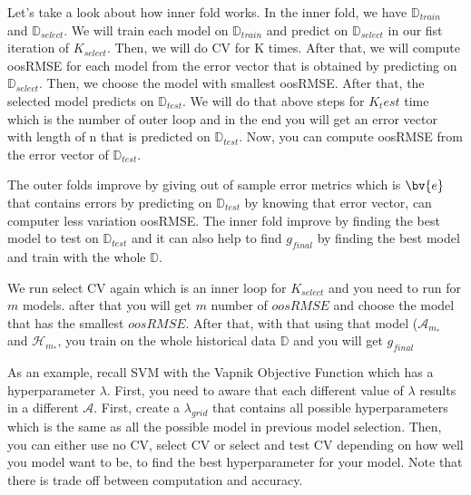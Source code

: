 \documentclass[12pt]{article}
\begin{document}
\begin{enumerate}
Let's take a look about how inner fold works. In the inner fold, we have $\mathbb{D}_{train}$ and $\mathbb{D}_{select}$. We will train each model on $\mathbb{D}_{train}$ and predict on $\mathbb{D}_{select}$ in our fist iteration of $K_{select}$. Then, we will do CV for K times. After that, we will compute oosRMSE for each model from the error vector that is obtained by predicting on $\mathbb{D}_{select}$. Then, we choose the model with smallest oosRMSE. After that, the selected model predicts on $\mathbb{D}_{test}$. 
We will do that above steps for $K_test$ time which is the number of outer loop and in the end you will get an error vector with length of n that is predicted on $\mathbb{D}_{test}$. Now, you can compute oosRMSE from the error vector of $\mathbb{D}_{test}$.

The outer folds improve by giving out of sample error metrics which is $\bv{e}$ that contains errors by predicting on $\mathbb{D}_{test}$ by knowing that error vector, can computer less variation oosRMSE.  The inner fold improve by finding the best model to test on $\mathbb{D}_{test}$ and it can also help to find $g_{final}$ by finding the best model and train with the whole $\mathbb{D}$.


We run select CV again which is an inner loop for $K_{select}$ and you need to run for $m$ models. after that you will get $m$ number of $oosRMSE$ and choose the model that has the smallest $oosRMSE$. After that, with that using that model ($\mathcal{A}_{m_*}$ and $\mathcal{H}_{m_*}$, you train on the whole historical data $\mathbb{D}$ and you will get $g_{final}$


As an example, recall SVM with the Vapnik Objective Function which has a hyperparameter $\lambda$. First, you need to aware that each different value of $\lambda$ results in a different $\mathcal{A}$. First, create a $\lambda_{grid}$ that contains all possible hyperparameters which is the same as all the possible model in previous model selection. Then, you can either use no CV, select CV or select and test CV depending on how well you model want to be, to find the best hyperparameter for your model. Note that there is trade off between computation and accuracy.


\end{enumerate}
\end{document}
